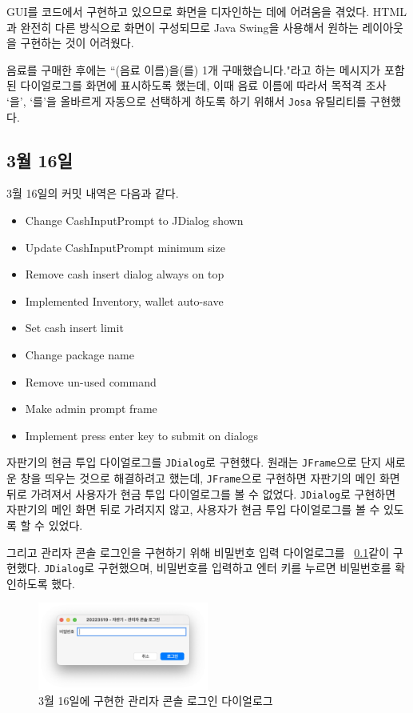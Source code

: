 \documentclass{oblivoir}
\newcommand{\figref}[1]{\figurename~\ref{#1}}
\begin{document}
    GUI를 코드에서 구현하고 있으므로 화면을 디자인하는 데에 어려움을 겪었다.
    HTML과 완전히 다른 방식으로 화면이 구성되므로 Java Swing을 사용해서 원하는 레이아웃을 구현하는 것이 어려웠다.

    음료를 구매한 후에는 ``(음료 이름)을(를) 1개 구매했습니다."라고 하는 메시지가 포함된
    다이얼로그를 화면에 표시하도록 했는데, 이때 음료 이름에 따라서 목적격 조사 `을', `를'을 올바르게 자동으로 선택하게 하도록 하기 위해서
    \texttt{Josa} 유틸리티를 구현했다.

    \subsection{3월 16일}

    3월 16일의 커밋 내역은 다음과 같다.

    \begin{itemize}
        \item Change CashInputPrompt to JDialog shown
        \item Update CashInputPrompt minimum size
        \item Remove cash insert dialog always on top
        \item Implemented Inventory, wallet auto-save
        \item Set cash insert limit
        \item Change package name
        \item Remove un-used command
        \item Make admin prompt frame
        \item Implement press enter key to submit on dialogs
    \end{itemize}

    자판기의 현금 투입 다이얼로그를 \texttt{JDialog}로 구현했다.
    원래는 \texttt{JFrame}으로 단지 새로운 창을 띄우는 것으로 해결하려고 했는데,
    \texttt{JFrame}으로 구현하면 자판기의 메인 화면 뒤로 가려져서 사용자가 현금 투입 다이얼로그를 볼 수 없었다.
    \texttt{JDialog}로 구현하면 자판기의 메인 화면 뒤로 가려지지 않고, 사용자가 현금 투입 다이얼로그를 볼 수 있도록 할 수 있었다.

    그리고 관리자 콘솔 로그인을 구현하기 위해 비밀번호 입력 다이얼로그를 \figref{}\와 같이 구현했다.
    \texttt{JDialog}로 구현했으며, 비밀번호를 입력하고 엔터 키를 누르면 비밀번호를 확인하도록 했다.
    \begin{figure}[h]
        \centering
        \includegraphics[width=0.5\textwidth]{0316-password-dialog.png}
        \caption{3월 16일에 구현한 관리자 콘솔 로그인 다이얼로그}
        \label{fig:0316-password-dialog}
    \end{figure}
\end{document}
